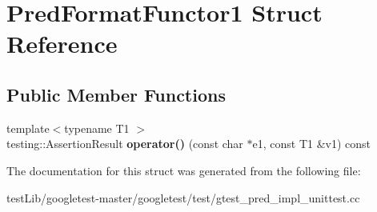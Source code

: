 \hypertarget{structPredFormatFunctor1}{}\section{Pred\+Format\+Functor1 Struct Reference}
\label{structPredFormatFunctor1}
\subsection*{Public Member Functions}
\begin{DoxyCompactItemize}
\item 
\mbox{\label{structPredFormatFunctor1_ac2c414b5fa65b41b0ab5967f9f1e5bff}} 
{\footnotesize template$<$typename T1 $>$ }\\testing\+::\+Assertion\+Result {\bfseries operator()} (const char $\ast$e1, const T1 \&v1) const
\end{DoxyCompactItemize}


The documentation for this struct was generated from the following file\+:\begin{DoxyCompactItemize}
\item 
test\+Lib/googletest-\/master/googletest/test/gtest\+\_\+pred\+\_\+impl\+\_\+unittest.\+cc\end{DoxyCompactItemize}
